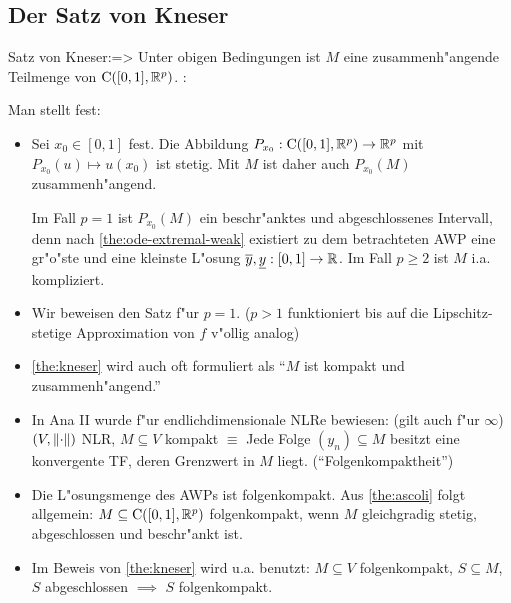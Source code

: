 \subsection{Der Satz von Kneser}
\theorem Satz von Kneser:=>{
  \label{the:kneser}
  Unter obigen Bedingungen ist $M$ eine zusammenh"angende Teilmenge von 
  ${\rm C}([0,1],\mathbb R^p)$.
  }
\remark:{
  Man stellt fest:
  \begin{itemize}
    \item Sei $x_0\in[0,1]$ fest. Die Abbildung
      $P_{x_0}:{\rm C}([0,1],\mathbb R^p)\to\mathbb R^p$ mit 
      $P_{x_0}(u)\mapsto u(x_0)$ ist stetig. Mit $M$ ist daher
      auch $P_{x_0}(M)$ zusammenh"angend.
      
      Im Fall $p=1$ ist $P_{x_0}(M)$ ein beschr"anktes und 
      abgeschlossenes Intervall, denn nach 
      \ref{the:ode-extremal-weak} existiert zu dem betrachteten AWP
      eine gr"o"ste und eine kleinste L"osung 
      $\overline y,\underline y:[0,1]\to\mathbb R$. Im Fall $p\geq 2$ ist $M$
      i.a. kompliziert.
    \item Wir beweisen den Satz f"ur $p=1$. ($p>1$ funktioniert
      bis auf die Lipschitz-stetige Approximation von $f$ v"ollig
      analog)
    \item \ref{the:kneser} wird auch oft formuliert als
      ``$M$ ist kompakt und zusammenh"angend.''
    \item In Ana II wurde f"ur endlichdimensionale NLRe bewiesen:
      (gilt auch f"ur $\infty$)
      $(V,{\left\| \cdot\right\|})$ NLR, $M\subseteq V$ kompakt $\equiv$
      Jede Folge $(y_n)\subseteq M$ besitzt eine konvergente TF, 
      deren Grenzwert in $M$ liegt.
      (``Folgenkompaktheit'')
    \item Die L"osungsmenge des AWPs ist folgenkompakt. Aus 
      \ref{the:ascoli} folgt allgemein:
      $M\subseteq{\rm C}([0,1],\mathbb R^p)$ folgenkompakt, wenn
      $M$ gleichgradig stetig, abgeschlossen und beschr"ankt ist.
    \item Im Beweis von \ref{the:kneser} wird u.a. benutzt:
      $M\subseteq V$ folgenkompakt, $S\subseteq M$, $S$ abgeschlossen
      $\implies$ $S$ folgenkompakt.
    \end{itemize}
  }

